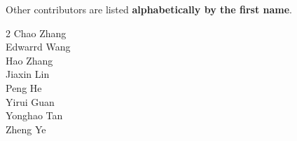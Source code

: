 \documentclass{article} %
\begin{document}
\large{Other contributors are listed \textbf{alphabetically by the first name}.} 
\large{
\color{tencentblue}%
\begin{multicols}{2}
\raggedcolumns
Chao Zhang\\
Edwarrd Wang\\
Hao Zhang\\
Jiaxin Lin\\
Peng He\\
Yirui Guan\\
Yonghao Tan\\
Zheng Ye\\
\end{multicols}}

\clearpage



\end{document}
